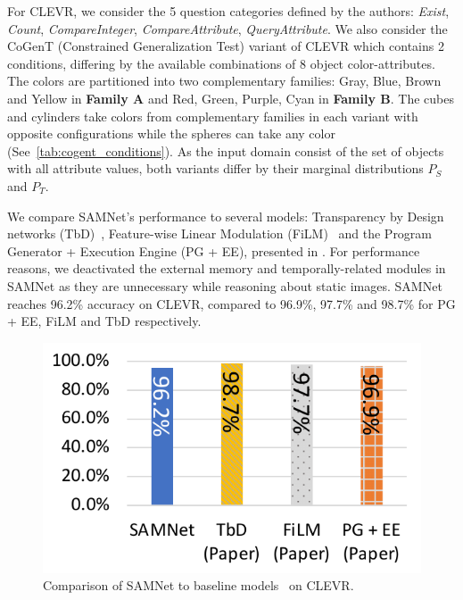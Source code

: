 For CLEVR, we consider the 5 question categories defined by the authors: \textit{Exist}, \textit{Count}, \textit{CompareInteger}, \textit{CompareAttribute}, \textit{QueryAttribute}. We also consider the CoGenT (Constrained Generalization Test) variant of CLEVR which contains 2 conditions, differing by the available combinations of 8 object color-attributes. The colors are partitioned into two complementary families:
Gray, Blue, Brown and Yellow in \textbf{Family A} and Red, Green, Purple, Cyan in \textbf{Family B}.
The cubes and cylinders take colors from complementary families in each variant with opposite configurations while the spheres can take any color (See~\cref{tab:cogent_conditions}).
As the input domain consist of the set of objects with all attribute values, both variants differ by their marginal distributions $P_S$ and $P_T$.

We compare SAMNet's performance to several models: Transparency by Design networks (TbD)~\cite{mascharka2018transparency}, Feature-wise Linear Modulation (FiLM)~\cite{perez2018film} and the Program Generator + Execution Engine (PG + EE), presented in \cite{johnson2017inferring}. For performance reasons, we deactivated the external memory and temporally-related modules in SAMNet as they are unnecessary while reasoning about static images. SAMNet reaches 96.2\% accuracy on CLEVR, compared to 96.9\%, 97.7\% and 98.7\% for PG + EE, FiLM and TbD respectively.

\begin{figure}[htbp]
	\centering
 	\includegraphics[width=\columnwidth]{../results/CLEVR_baselines_comparison.pdf}
 	\caption{Comparison of SAMNet to baseline models~\cite{mascharka2018transparency, perez2018film, johnson2017inferring} on CLEVR.}
 	\label{fig:clevr-baseline-compare}
\end{figure}

